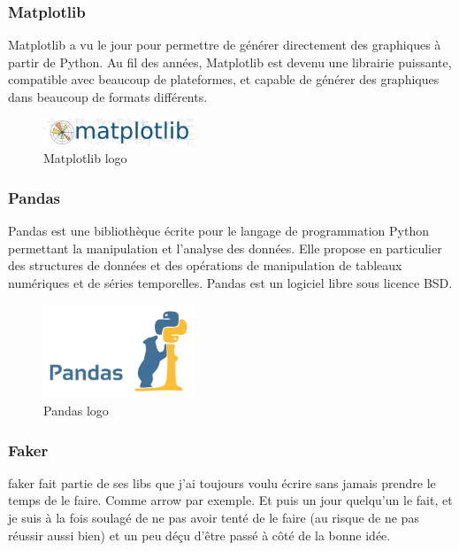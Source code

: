 \subsubsection*{Matplotlib}
Matplotlib a vu le jour pour permettre de générer directement des graphiques à partir de Python. Au fil des années, Matplotlib est devenu une librairie puissante, compatible avec beaucoup de plateformes, et capable de générer des graphiques dans beaucoup de formats différents.
\begin{figure}[!ht]\centering
\includegraphics[width=0.4\textwidth]{chapitres/chapitre7/figures/Matplotlib.png}
\caption{Matplotlib logo }
\label{fig:matplotlib}
\end{figure}
\subsubsection*{Pandas}
Pandas est une bibliothèque écrite pour le langage de programmation Python permettant la manipulation et l'analyse des données. Elle propose en particulier des structures de données et des opérations de manipulation de tableaux numériques et de séries temporelles. Pandas est un logiciel libre sous licence BSD.
\newpage
\begin{figure}[!ht]\centering
\includegraphics[width=0.4\textwidth]{chapitres/chapitre7/figures/pandas.jpg}
\caption{Pandas logo }
\label{fig:pandas}
\end{figure}
\subsubsection*{Faker}
faker fait partie de ses libs que j’ai toujours voulu écrire sans jamais prendre le temps de le faire. Comme arrow par exemple. Et puis un jour quelqu’un le fait, et je suis à la fois soulagé de ne pas avoir tenté de le faire (au risque de ne pas réussir aussi bien) et un peu déçu d’être passé à côté de la bonne idée.


